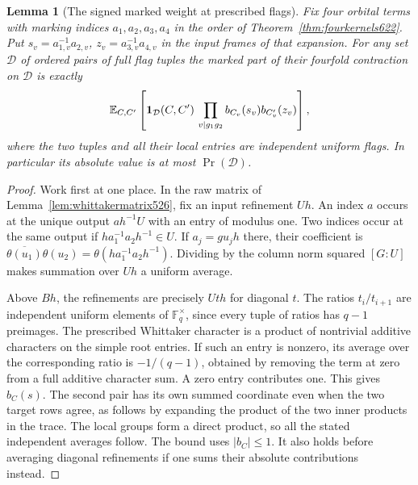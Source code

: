 \documentclass[a4paper,11pt]{article}
\newtheorem{lemma}[proposition]{Lemma}
\theoremstyle{definition}
\theoremstyle{remark}
\numberwithin{equation}{section}
\begin{document}
\begin{lemma}[The signed marked weight at prescribed flags]
\leavevmode\label{lem:flagsign658}
Fix four orbital terms with marking indices \(a_1,a_2,a_3,a_4\)
in the order of Theorem~\ref{thm:fourkernels622}. Put
\(s_v=a_{1,v}^{-1}a_{2,v}\), \(z_v=a_{3,v}^{-1}a_{4,v}\) in
the input frames of that expansion. For any set \(\mathcal D\) of
ordered pairs of full flag tuples the marked part of their
fourfold contraction on \(\mathcal D\) is exactly
\[
   \mathbb E_{C,C'}
   \left[{\bf1}_{\mathcal D}(C,C')\,
         \prod_{v\mid g_1g_2} b_{C_v}(s_v)b_{C'_v}(z_v)\right],
\]
where the two tuples and all their local entries are independent
uniform flags. In particular its absolute value is at most
\(\Pr(\mathcal D)\).
\end{lemma}
\begin{proof}
Work first at one place. In the raw matrix of
Lemma~\ref{lem:whittakermatrix526}, fix an input refinement
\(Uh\). An index \(a\) occurs at the unique output \(ah^{-1}U\)
with an entry of modulus one. Two indices occur at the same output
if \(ha_1^{-1}a_2h^{-1}\in U\). If \(a_j=g u_j h\) there,
their coefficient is \(\overline{\theta(u_1)}\theta(u_2)
=\theta(ha_1^{-1}a_2h^{-1})\). Dividing by the column norm
squared \([G:U]\) makes summation over \(Uh\) a uniform average.

Above \(Bh\), the refinements are precisely \(Uth\) for
diagonal \(t\). The ratios \(t_i/t_{i+1}\) are independent
uniform elements of \(\mathbb F_q^\times\), since every tuple of
ratios has \(q-1\) preimages. The prescribed Whittaker character
is a product of nontrivial additive characters on the simple
root entries. If such an entry is nonzero, its average over
the corresponding ratio is \(-1/(q-1)\), obtained by removing
the term at zero from a full additive character sum. A zero
entry contributes one. This gives \(b_C(s)\). The second pair
has its own summed coordinate even when the two target rows
agree, as follows by expanding the product of the two inner
products in the trace. The local groups form a direct product,
so all the stated independent averages follow. The bound uses
\(|b_C|\le1\). It also holds before averaging diagonal
refinements if one sums their absolute contributions instead.
\end{proof}
\end{document}
